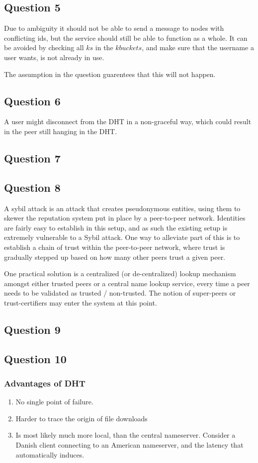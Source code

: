 \subsection{Question 5}
Due to ambiguity it should not be able to send a message to nodes with
conflicting ids, but the service should still be able to function as a
whole. It can be avoided by checking all $ks$ in the $kbuckets$, and
make sure that the username a user wants, is not already in use.

The assumption in the question guarentees that this will not happen.

\subsection{Question 6}
A user might disconnect from the DHT in a non-graceful way, which
could result in the peer still hanging in the DHT.

\subsection{Question 7}

\subsection{Question 8}
A sybil attack is an attack that creates pseudonymous entities, using them
to skewer the reputation system put in place by a peer-to-peer network.
Identities are fairly easy to establish in this setup, and as such the existing
setup is extremely vulnerable to a Sybil attack. One way to alleviate part of
this is to establish a chain of trust within the peer-to-peer network, where
trust is gradually stepped up based on how many other peers trust a given peer.

One practical solution is a centralized (or de-centralized) lookup mechanism
amongst either trusted peers or a central name lookup service, every time a
peer needs to be validated as trusted / non-trusted. The notion of super-peers
or trust-certifiers may enter the system at this point.
\subsection{Question 9}

\subsection{Question 10}
\subsubsection{Advantages of DHT}
\begin{enumerate}
    \item No single point of failure.
    \item Harder to trace the origin of file downloads
    \item Is most likely much more local, than the central nameserver. Consider
        a Danish client connecting to an American nameserver, and the latency
        that automatically induces.
\end{enumerate}
